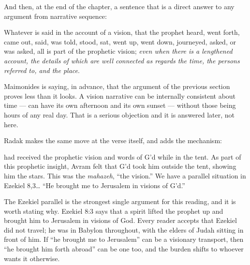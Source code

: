 \noindent And then, at the end of the chapter, a sentence that is a direct
answer to any argument from narrative sequence:

\begin{studyframe}
Whatever is said in the account of a vision, that the prophet heard, went forth,
came out, said, was told, stood, sat, went up, went down, journeyed, asked, or
was asked, all is part of the prophetic vision; \emph{even when there is a
lengthened account, the details of which are well connected as regards the time,
the persons referred to, and the place}.
\end{studyframe}

Maimonides is saying, in advance, that the argument of the previous section
proves less than it looks. A vision narrative can be internally consistent about
time --- can have its own afternoon and its own sunset --- without those being
hours of any real day. That is a serious objection and it is answered later, not
here.

Radak makes the same move at the verse itself, and adds the mechanism:

\begin{studyframe}
[He] had received the prophetic vision and words of G'd while in the tent. As
part of this prophetic insight, Avram felt that G'd took him outside the tent,
showing him the stars. This was the \textit{mahazeh}, ``the vision.'' We have a
parallel situation in Ezekiel 8,3\dots{} ``He brought me to Jerusalem in visions
of G'd.''
\end{studyframe}

\noindent The Ezekiel parallel is the strongest single argument for this
reading, and it is worth stating why. Ezekiel 8:3 says that a spirit lifted the
prophet up and brought him to Jerusalem in visions of God. Every reader accepts
that Ezekiel did not travel; he was in Babylon throughout, with the elders of
Judah sitting in front of him. If ``he brought me to Jerusalem'' can be a
visionary transport, then ``he brought him forth abroad'' can be one too, and
the burden shifts to whoever wants it otherwise.

